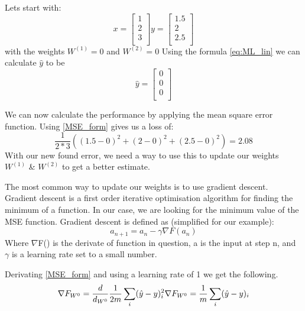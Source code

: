    
Lets start with: 
\begin{equation}
	x=\left[ \begin{array}{c} 1\\ 2\\ 3\\ \end{array} \right]
	y=\left[\begin{array}{c} 1.5\\2\\ 2.5\\\end{array}\right]
\end{equation}
with the weights $W^{(1)}=0$ and $W^{(2)}=0$
Using the formula \ref{eq:ML_lin} we can calculate  $\hat{y}$ to be
\begin{equation}
    \hat{y}=\left[\begin{array}{c} 0\\0\\ 0\\\end{array}\right]
\end{equation}

We can now calculate the performance by applying the mean square error function. Using \ref{MSE_form} gives us a loss of:
\begin{equation}
   \frac{1}{2*3} ({(1.5-0)}^2+{(2-0)}^2+{(2.5-0)}^2)=2.08
\end{equation}
With our new found error, we need a way to use this to update our weights $W^{(1)}$ \& $W^{(2)}$ to get a better estimate. 
    

The most common way to update our weights is to use gradient descent. 
Gradient descent is a first order iterative optimisation algorithm  for finding the minimum of a function. In our case, we are looking for the minimum value of the MSE function. Gradient descent is defined as (simplified for our example):
\begin{equation}
	a_{n+1}= a_{n} - \gamma \nabla F(a_{n})
\end{equation}
Where $\nabla$F() is the derivate of function in question, a is the input at step n, and $\gamma$ is a learning rate set to a small number. 

Derivating \ref{MSE_form} and using a learning rate of 1 we get the following. 
\begin{equation}
\label{MSE_deriv_w0}
     \nabla F_{W^0} = \frac{d}{d_{W^{0}} } \frac{1}{2m} \sum_i (\hat{y}-y)_i^2 \\
     \nabla F_{W^0} = \frac{1}{m} \sum_i (\hat{y}-y)_i\\
\end{equation}

